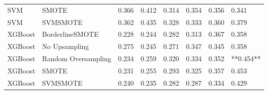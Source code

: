\begin{tabular}{llllllll}
                         SVM &               SMOTE & 0.366 &                     0.412 &                 0.314 &                  0.354 &                                   0.356 &     0.341 \\
                         SVM &            SVMSMOTE & 0.362 &                     0.435 &                 0.328 &                  0.333 &                                   0.360 &     0.379 \\
                     XGBoost &     BorderlineSMOTE & 0.228 &                     0.244 &                 0.282 &                  0.313 &                                   0.367 &     0.358 \\
                     XGBoost &       No Upsampling & 0.275 &                     0.245 &                 0.271 &                  0.347 &                                   0.345 &     0.358 \\
                     XGBoost & Random Oversampling & 0.234 &                     0.259 &                 0.320 &                  0.334 &                                   0.352 & **0.454** \\
                     XGBoost &               SMOTE & 0.231 &                     0.255 &                 0.293 &                  0.325 &                                   0.357 &     0.453 \\
                     XGBoost &            SVMSMOTE & 0.240 &                     0.235 &                 0.282 &                  0.287 &                                   0.334 &     0.429 \\
\bottomrule
\end{tabular}
